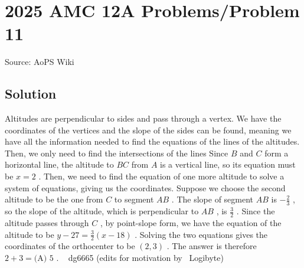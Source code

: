\documentclass[12pt]{article}
\begin{document}
\section*{{2025 AMC 12A Problems/Problem 11}}
Source: AoPS Wiki

\subsection*{Solution}
Altitudes are perpendicular to sides and pass through a vertex. We have the coordinates of the vertices and the slope of the sides can be found, meaning we have all the information needed to find the equations of the lines of the altitudes. Then, we only need to find the intersections of the lines Since $B$ and $C$ form a horizontal line, the altitude to $BC$ from $A$ is a vertical line, so its equation must be $x=2$ . Then, we need to find the equation of one more altitude to solve a system of equations, giving us the coordinates. Suppose we choose the second altitude to be the one from $C$ to segment $AB$ . The slope of segment $AB$ is $-\frac{2}{3}$ , so the slope of the altitude, which is perpendicular to $AB$ , is $\frac{3}{2}$ . Since the altitude passes through $C$ , by point-slope form, we have the equation of the altitude to be $y-27=\frac{3}{2}(x-18)$ . Solving the two equations gives the coordinates of the orthocenter to be $(2, 3)$ . The answer is therefore $2+3=\boxed{\text{(A) }5}$ . ~ dg6665 (edits for motivation by ~Logibyte)
\end{document}
